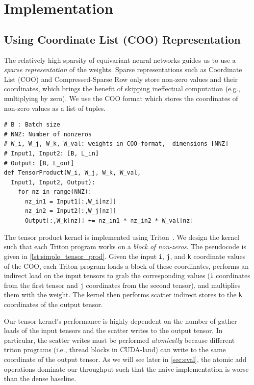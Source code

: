 \section{Implementation}
\label{sec:impl}

\subsection{Using Coordinate List (COO) Representation}
\label{sec:impl:coo}

The relatively high sparsity of equivariant neural networks guides us to use a \textit{sparse representation} of the weights. Sparse representations such as Coordinate List (COO) and Compressed-Sparse Row only store non-zero values and their coordinates,
which brings the benefit of skipping ineffectual computation (e.g., multiplying by zero). We use the COO format which stores the coordinates of non-zero values as a list of tuples.

\begin{lstlisting}[caption={Hash table lookup code.}, label={lst:simple_tensor_prod}, style=custompython]
# B : Batch size
# NNZ: Number of nonzeros
# W_i, W_j, W_k, W_val: weights in COO-format,  dimensions [NNZ]
# Input1, Input2: [B, L_in]
# Output: [B, L_out]
def TensorProduct(W_i, W_j, W_k, W_val, 
  Input1, Input2, Output):
    for nz in range(NNZ):
      nz_in1 = Input1[:,W_i[nz]]
      nz_in2 = Input2[:,W_j[nz]]
      Output[:,W_k[nz]] += nz_in1 * nz_in2 * W_val[nz]
\end{lstlisting}

The tensor product kernel is implemented using Triton~\cite{b1}.
We design the kernel such that each Triton program works on a \textit{block of non-zeros}.
The pseudocode is given in \autoref{lst:simple_tensor_prod}.
Given the input \texttt{i}, \texttt{j}, and \texttt{k} coordinate values of the COO,
each Triton program loads a block of these coordinates,
performs an indirect load on the input tensors to grab the corresponding values
(\texttt{i} coordinates from the first tensor and \texttt{j} coordinates from the second tensor),
and multiplies them with the weight.
The kernel then performs scatter indirect stores to the \texttt{k} coordinates
of the output tensor.

Our tensor kernel's performance is highly dependent on the number of gather loads of the input tensors
and the scatter writes to the output tensor.
In particular, the scatter writes must be performed \textit{atomically} because different triton programs (i.e., thread blocks in CUDA-land) can write to the same coordinate of the output tensor.
As we will see later in \autoref{sec:eval}, the atomic add operations dominate our throughput such that the naive implementation is worse than the dense baseline.

